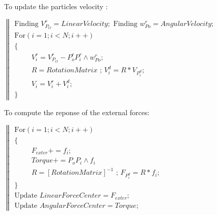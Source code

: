 \documentclass[a4paper,10pt]{article}
\begin{document}
\begin{center}To update the particles velocity : \end{center}
$
\left\|
  \begin{array}{lll}
  \text{Finding  } V^r_{P_O}=LinearVelocity;
  \text{   Finding  } w^r_{Po}=AngularVelocity; \\
  \text{For} (i=1;i<N;i++) \\ \{ \\
    \hspace{1cm} V^r_i= V^r_{P_O} - P^r_oP^r_i \wedge w^r_{Po} ;\\
    \hspace{1cm} R=RotationMatrix \text{  ;  } V^d_i=R*V_{P^d_i};\\
    \hspace{1cm} V_i= V^r_i + V^d_i; \\
    \} 
  \end{array}
\right.
$
\begin{center}To compute the reponse of the external forces:\end{center}    
$
\left\|
  \begin{array}{lll}
  \text{For} (i=1;i<N;i++) \\ \{ \\
    \hspace{1cm} F_{exter}+=f_i;\\
    \hspace{1cm} Torque+=P_oP_i  \wedge  f_i\\
    \hspace{1cm} R=\left[ RotationMatrix \right]^{-1} \text{  ;  } F_{P^d_i}=R*f_i;\\
    \} \\
  \text{Update } LinearForceCenter=F_{exter}; \\
  \text{Update } AngularForceCenter=Torque; 
  \end{array}
\right.
$
\newpage
\end{document}
